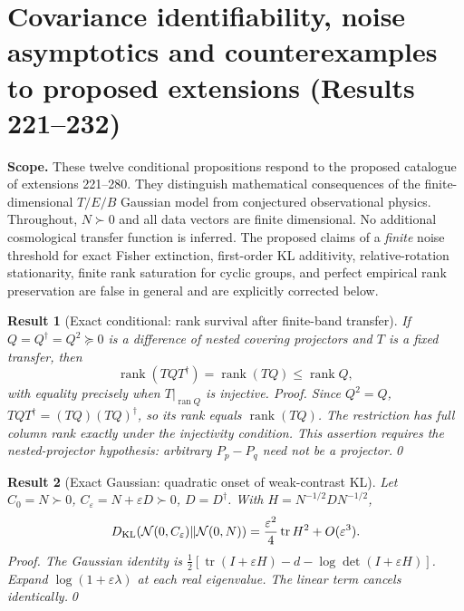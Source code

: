 \documentclass[aps,prd,onecolumn,notitlepage,groupedaddress,11pt]{revtex4-2}
\newtheorem{result}{Result}
\begin{document}
\section{Covariance identifiability, noise asymptotics and counterexamples to proposed extensions (Results 221--232)}
\label{sec:post220-audit}
\noindent\textbf{Scope.} These twelve conditional propositions respond to the proposed catalogue of extensions 221--280. They distinguish mathematical consequences of the finite-dimensional $T/E/B$ Gaussian model from conjectured observational physics. Throughout, $N\succ0$ and all data vectors are finite dimensional. No additional cosmological transfer function is inferred. The proposed claims of a \emph{finite} noise threshold for exact Fisher extinction, first-order KL additivity, relative-rotation stationarity, finite rank saturation for cyclic groups, and perfect empirical rank preservation are false in general and are explicitly corrected below.

\begin{result}[\textsf{Exact conditional}: rank survival after finite-band transfer]\label{new:221}
If $Q=Q^\dagger=Q^2\succeq0$ is a difference of nested covering projectors and $T$ is a fixed transfer, then
\begin{equation}\label{eq:post221}
\operatorname{rank}(TQT^\dagger)=\operatorname{rank}(TQ)\le\operatorname{rank}Q,
\end{equation}
with equality precisely when $T|_{\operatorname{ran}Q}$ is injective. \textit{Proof.} Since $Q^2=Q$, $TQT^\dagger=(TQ)(TQ)^\dagger$, so its rank equals $\operatorname{rank}(TQ)$. The restriction has full column rank exactly under the injectivity condition. This assertion requires the nested-projector hypothesis: arbitrary $P_p-P_q$ need not be a projector.\qed
\end{result}

\begin{result}[\textsf{Exact Gaussian}: quadratic onset of weak-contrast KL]\label{new:222}
Let $C_0=N\succ0$, $C_\varepsilon=N+\varepsilon D\succ0$, $D=D^\dagger$. With $H=N^{-1/2}DN^{-1/2}$,
\begin{equation}\label{eq:post222}
D_{\rm KL}(\mathcal N(0,C_\varepsilon)\Vert\mathcal N(0,N))
=\frac{\varepsilon^2}{4}\operatorname{tr}H^2+O(\varepsilon^3).
\end{equation}
\textit{Proof.} The Gaussian identity is $\frac12[\operatorname{tr}(I+\varepsilon H)-d-\log\det(I+\varepsilon H)]$. Expand $\log(1+\varepsilon\lambda)$ at each real eigenvalue. The linear term cancels identically.\qed
\end{result}
\end{document}
